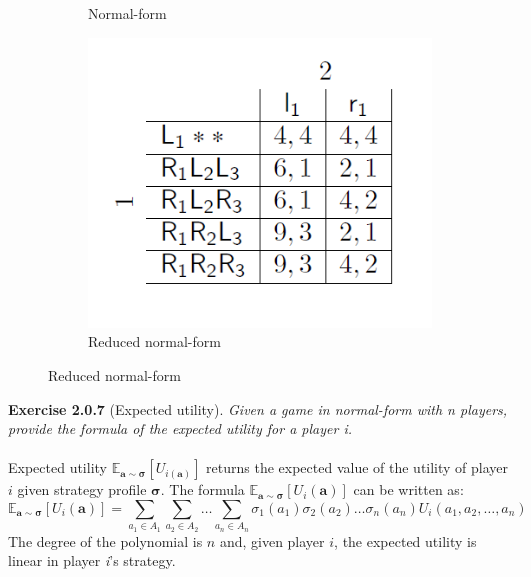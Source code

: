 \begin{figure}[H]
\begin{subfigure}[t]{0.3\textwidth}
 \caption{Normal-form}
\end{subfigure}\hfill
\begin{subfigure}[t]{0.3\textwidth}
 \includegraphics[width=\textwidth]{images/img_1_2_03.png}
 \caption{Reduced normal-form}
\end{subfigure}
\end{figure}
\noindent
\textbf{Exercise 2.0.7} (Expected utility). \textit{Given a game in normal-form with n players, provide the formula of the
expected utility for a player i.}\\\\
Expected utility $ \mathbb{E}_{\mathbf{a} \sim \bm{\sigma}} [U_{i(\mathbf{a})}] $ returns the expected value of the utility of player $i$ given strategy profile $ \bm{\sigma} $. The formula $ \mathbb{E}_{\mathbf{a} \sim \bm{\sigma}} [U_{i}(\mathbf{a})] $ can be written as:
$$
\mathbb{E}_{\mathbf{a} \sim \bm{\sigma}} [U_{i}(\mathbf{a})] = 
\sum_{a_{1} \in A_{1}} \sum_{a_{2} \in A_{2}} \ldots \sum_{a_{n} \in A_{n}}
\sigma_{1}(a_{1}) \sigma_{2}(a_{2}) \ldots \sigma_{n}(a_{n})
U_{i}(a_{1}, a_{2}, \ldots, a_{n})
$$
The degree of the polynomial is $ n $ and, given player $ i $, the expected utility is linear in player \textit{i}'s strategy.\\\\


